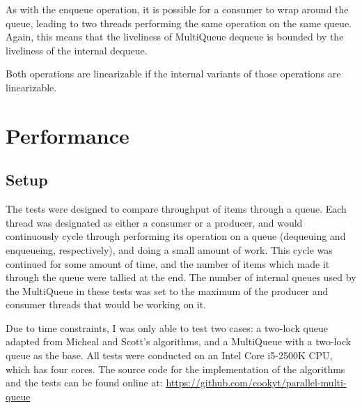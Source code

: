 \documentclass[12pt]{report}
\begin{document}
As with the enqueue operation, it is possible for a consumer to wrap around the
queue, leading to two threads performing the same operation on the same queue.
Again, this means that the liveliness of MultiQueue dequeue is bounded by the
liveliness of the internal dequeue.

Both operations are linearizable if the internal variants of those operations
are linearizable.


\section{Performance}
\subsection{Setup}
The tests were designed to compare throughput of items through a queue. Each
thread was designated as either a consumer or a producer, and would
continuously cycle through performing its operation on a queue (dequeuing and
enqueueing, respectively), and doing a small amount of work. This cycle was
continued for some amount of time, and the number of items which made it
through the queue were tallied at the end. The number of internal queues used
by the MultiQueue in these tests was set to the maximum of the producer and
consumer threads that would be working on it.

Due to time constraints, I was only able to test two cases: a two-lock queue
adapted from Micheal and Scott's algorithms\cite{michael1996}, and a MultiQueue
with a two-lock queue as the base. All tests were conducted on an Intel Core
i5-2500K CPU, which has four cores. The source code for the implementation of
the algorithms and the tests can be found online at:
\url{https://github.com/cookyt/parallel-multi-queue}
\end{document}
